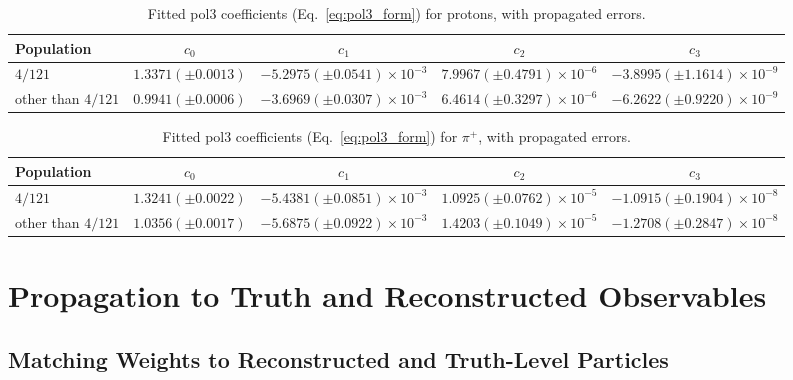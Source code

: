 \documentclass[%
article,
nofootinbib
]{revtex4-2}
\begin{document}
\begin{table}[htb!]
\centering
\small
\caption{Fitted pol3 coefficients (Eq.~\ref{eq:pol3_form}) for protons, with
propagated errors.}
\label{tab:pol3_coefficients_proton}
\setlength{\tabcolsep}{6pt}
\begin{tabular}{lcccc}
\hline\hline
Population & $c_0$ & $c_1$ & $c_2$ & $c_3$ \\
\hline
$4/121$
 & $1.3371(\pm0.0013)$
 & $-5.2975(\pm0.0541)\times10^{-3}$
 & $7.9967(\pm0.4791)\times10^{-6}$
 & $-3.8995(\pm1.1614)\times10^{-9}$ \\
other than $4/121$
 & $0.9941(\pm0.0006)$
 & $-3.6969(\pm0.0307)\times10^{-3}$
 & $6.4614(\pm0.3297)\times10^{-6}$
 & $-6.2622(\pm0.9220)\times10^{-9}$ \\
\hline\hline
\end{tabular}
\end{table}

\begin{table}[htb!]
\centering
\small
\caption{Fitted pol3 coefficients (Eq.~\ref{eq:pol3_form}) for $\pi^+$, with
propagated errors.}
\label{tab:pol3_coefficients_piPlus}
\setlength{\tabcolsep}{6pt}
\begin{tabular}{lcccc}
\hline\hline
Population & $c_0$ & $c_1$ & $c_2$ & $c_3$ \\
\hline
$4/121$
 & $1.3241(\pm0.0022)$
 & $-5.4381(\pm0.0851)\times10^{-3}$
 & $1.0925(\pm0.0762)\times10^{-5}$
 & $-1.0915(\pm0.1904)\times10^{-8}$ \\
other than $4/121$
 & $1.0356(\pm0.0017)$
 & $-5.6875(\pm0.0922)\times10^{-3}$
 & $1.4203(\pm0.1049)\times10^{-5}$
 & $-1.2708(\pm0.2847)\times10^{-8}$ \\
\hline\hline
\end{tabular}
\end{table}


\section{\label{sec:propagation}Propagation to Truth and Reconstructed Observables}

\subsection{\label{subsec:matching}Matching Weights to Reconstructed and Truth-Level Particles}
\end{document}
